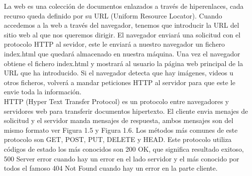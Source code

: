 La web es una colección de documentos enlazados a través de hiperenlaces, cada recurso queda definido por su URL (Uniform Resource Locator). Cuando accedemos a la web a través del navegador, tenemos que introducir la URL del sitio web al que nos queremos dirigir. El navegador enviará una solicitud con el protocolo HTTP al sevidor, este le enviará a nuestro navegador un fichero index.html que quedará almacenado en nuestra máquina. Una vez el navegador obtiene el fichero index.html y mostrará al usuario la página web principal de la URL que ha introducido. Si el navegador detecta que hay imágenes, videos u otros ficheros, volverá a mandar peticiones HTTP al servidor para que este le envie toda la información.\\
 HTTP (Hyper Text Transfer Protocol) es un protocolo entre navegadores y servidores web para transferir documentos hipertexto. El cliente envia menajes de solicitud y el servidor manda mensajes de respuesta, ambos mensajes son del mismo formato ver Figura 1.5 y Figura 1.6. Los métodos más comunes de este protocolo son GET, POST, PUT, DELETE y HEAD. Este protocolo utiliza códigos de estado los más conocidos son 200 OK, que significa resultado exitoso, 500 Server error cuando hay un error en el lado servidor y el más conocido por todos el famoso 404 Not Found cuando hay un error en la parte cliente.
\\
